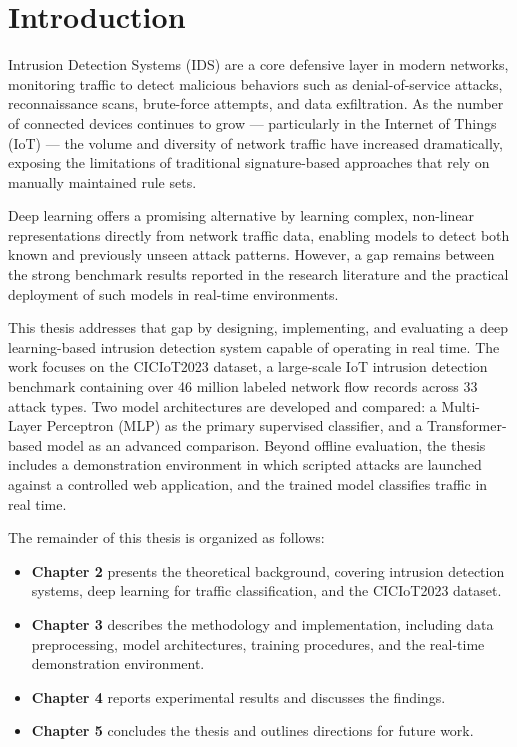 \chapter{Introduction}
\label{chap:introduction}

\par Intrusion Detection Systems (IDS) are a core defensive layer in modern networks, monitoring traffic to detect malicious behaviors such as denial-of-service attacks, reconnaissance scans, brute-force attempts, and data exfiltration. As the number of connected devices continues to grow --- particularly in the Internet of Things (IoT) --- the volume and diversity of network traffic have increased dramatically, exposing the limitations of traditional signature-based approaches that rely on manually maintained rule sets.

\par Deep learning offers a promising alternative by learning complex, non-linear representations directly from network traffic data, enabling models to detect both known and previously unseen attack patterns. However, a gap remains between the strong benchmark results reported in the research literature and the practical deployment of such models in real-time environments.

\par This thesis addresses that gap by designing, implementing, and evaluating a deep learning-based intrusion detection system capable of operating in real time. The work focuses on the CICIoT2023 dataset, a large-scale IoT intrusion detection benchmark containing over 46 million labeled network flow records across 33 attack types. Two model architectures are developed and compared: a Multi-Layer Perceptron (MLP) as the primary supervised classifier, and a Transformer-based model as an advanced comparison. Beyond offline evaluation, the thesis includes a demonstration environment in which scripted attacks are launched against a controlled web application, and the trained model classifies traffic in real time.

\par The remainder of this thesis is organized as follows:

\begin{itemize}
    \item \textbf{Chapter 2} presents the theoretical background, covering intrusion detection systems, deep learning for traffic classification, and the CICIoT2023 dataset.
    \item \textbf{Chapter 3} describes the methodology and implementation, including data preprocessing, model architectures, training procedures, and the real-time demonstration environment.
    \item \textbf{Chapter 4} reports experimental results and discusses the findings.
    \item \textbf{Chapter 5} concludes the thesis and outlines directions for future work.
\end{itemize}
